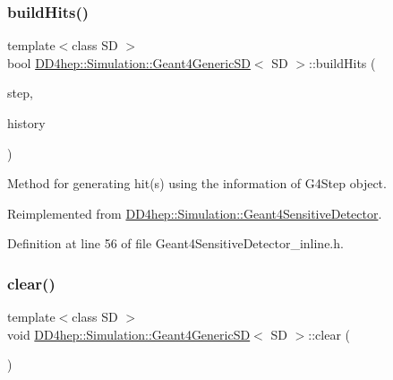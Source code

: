\subsubsection{\texorpdfstring{build\+Hits()}{buildHits()}}
{\footnotesize\ttfamily template$<$class SD $>$ \\
bool \hyperlink{class_d_d4hep_1_1_simulation_1_1_geant4_generic_s_d}{D\+D4hep\+::\+Simulation\+::\+Geant4\+Generic\+SD}$<$ SD $>$\+::build\+Hits (\begin{DoxyParamCaption}\item[{G4\+Step $\ast$}]{step,  }\item[{G4\+Touchable\+History $\ast$}]{history }\end{DoxyParamCaption})\hspace{0.3cm}{\ttfamily [virtual]}}



Method for generating hit(s) using the information of G4\+Step object. 



Reimplemented from \hyperlink{class_d_d4hep_1_1_simulation_1_1_geant4_sensitive_detector_a96d4594c8e1af23ef5c572938460670e}{D\+D4hep\+::\+Simulation\+::\+Geant4\+Sensitive\+Detector}.



Definition at line 56 of file Geant4\+Sensitive\+Detector\+\_\+inline.\+h.

\hypertarget{class_d_d4hep_1_1_simulation_1_1_geant4_generic_s_d_acf8f9146d5683a8131fc5d8ee26d7f01}{}\label{class_d_d4hep_1_1_simulation_1_1_geant4_generic_s_d_acf8f9146d5683a8131fc5d8ee26d7f01} 
\subsubsection{\texorpdfstring{clear()}{clear()}}
{\footnotesize\ttfamily template$<$class SD $>$ \\
void \hyperlink{class_d_d4hep_1_1_simulation_1_1_geant4_generic_s_d}{D\+D4hep\+::\+Simulation\+::\+Geant4\+Generic\+SD}$<$ SD $>$\+::clear (\begin{DoxyParamCaption}{ }\end{DoxyParamCaption})\hspace{0.3cm}{\ttfamily [virtual]}}



